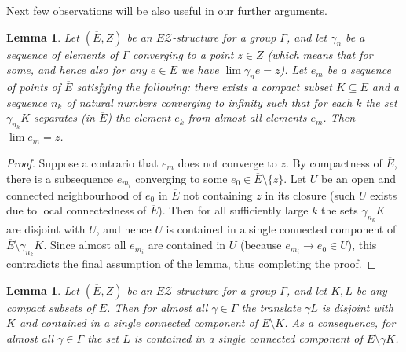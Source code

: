 \documentclass[12pt, a4paper]{article}
\newcommand{\8}{\infty}
\theoremstyle{break}
\newtheorem{lm}[thm]{Lemma}
\theoremstyle{defbreak}
\newcommand{\ol}[1]{\overline{#1}}
\begin{document}
Next few observations will be also useful in our further arguments.\medskip


\begin{lm}\label{lemma:separated_convergence_2}
    Let $(\ol{E},Z)$ be an $E\mathcal{Z}$-structure for a group $\Gamma$,
and let $\gamma_n$ be a sequence of elements of $\Gamma$ converging
to a point $z\in Z$ (which means that for some, and hence also for any
$e\in E$ we have $\lim\gamma_ne=z$).
Let $e_m$ be a sequence of points of $\ol E$ satisfying the following: 
there exists a compact subset $K\subseteq E$ and a sequence $n_k$
of natural numbers converging to infinity such that for each $k$
the set $\gamma_{n_k}K$ separates (in $\ol E$) the element $e_k$
from almost all elements $e_m$. Then $\lim e_m=z$.
\end{lm}

\begin{proof}
Suppose a contrario that $e_m$ does not converge to $z$.
By compactness of $\ol E$, there is a subsequence $e_{m_i}$
converging to some $e_0\in\ol E\setminus\{ z \}$.
Let $U$ be an open and connected neighbourhood of $e_0$ in $\ol E$
not containing $z$ in its closure (such $U$ exists due to local
connectedness of $\ol E$). 
Then for all sufficiently large $k$ the sets $\gamma_{n_k}K$
are disjoint with $U$, and hence $U$ is contained in a single connected
component of $\ol E\setminus\gamma_{n_k}K$. Since almost all $e_{m_i}$
are contained in $U$ (because $e_{m_i}\to e_0\in U$),
this contradicts the final assumption of the lemma,
thus completing the proof.
\end{proof}


\begin{lm}\label{translates-in-single-component}
Let $(\ol{E},Z)$ be an $E\mathcal{Z}$-structure for a group $\Gamma$, and
let $K,L$ be any compact subsets of $E$. Then for almost all 
$\gamma\in\Gamma$
the translate $\gamma L$ is disjoint with $K$ and contained in a single connected component of $E\setminus K$. As a consequence, 
for almost all $\gamma\in\Gamma$ the set $L$ is contained in a single
connected component of $E\setminus \gamma K$. 
\end{lm}
\end{document}
